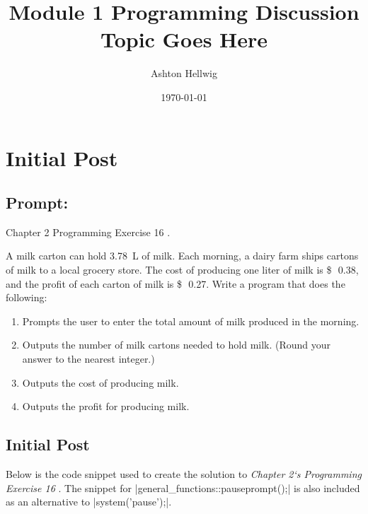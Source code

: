 \documentclass[a4paper, 11pt]{article}
\title{%
    Module 1 Programming Discussion\\%
    \large{Topic Goes Here}
  }
\author{Ashton Hellwig}
\date\today
\newcommand{\usd}[1]{\SI{#1}[\$\ensuremath{\,}]{}}
\begin{document}
  \maketitle
  \tableofcontents
  \listofalgorithms
  \newpage

  \section{Initial Post}
    \subsection{Prompt:}
      Chapter 2 Programming Exercise 16 \parencite[~\S2-16c]{textbook}.
      \begin{mdframed}[style=AnswerFrame,nobreak=true,align=center]
        A milk carton can hold \SI{3.78}{\liter} of milk. Each morning, a dairy
          farm ships cartons of milk to a local grocery store. The cost of
          producing one liter of milk is \usd{0.38}, and the profit of each
          carton of milk is \usd{0.27}. Write a program that does the following:

        \begin{enumerate}[label=\alph*.]
          \item Prompts the user to enter the total amount of milk produced in
            the morning.
          \item Outputs the number of milk cartons needed to hold milk.
            (Round your answer to the nearest integer.)
          \item Outputs the cost of producing milk.
          \item Outputs the profit for producing milk.
        \end{enumerate}
      \end{mdframed}

    \subsection{Initial Post}
      Below is the code snippet used to create the solution to \textit{Chapter
        2`s Programming Exercise 16} \parencite[~\S2-16c]{textbook}. The snippet
        for |general_functions::pauseprompt();| is also included as an
        alternative to |system('pause');|.
\end{document}
